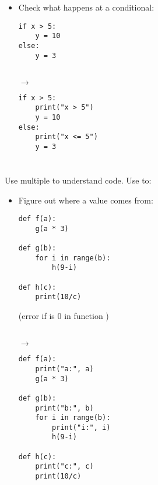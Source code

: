 \documentclass{poster}
\begin{document}
\begin{itemize}
\item Check what happens at a conditional: \\
\noindent
\begin{minipage}[t]{0.45\columnwidth}
\begin{lstlisting}
if x > 5:
    y = 10
else:
    y = 3
\end{lstlisting}
\end{minipage}
\begin{minipage}[t]{0.05\columnwidth}
\  \\
\hspace*{1ex}$\rightarrow$
\end{minipage}
\begin{minipage}[t]{0.45\columnwidth}
\begin{lstlisting}
if x > 5:
    print("x > 5")
    y = 10
else:
    print("x <= 5")
    y = 3
\end{lstlisting}
\end{minipage}


\end{itemize}

\section{}

Use multiple  to understand code. Use to:

\begin{itemize}

\item Figure out where a value comes from: \\
\noindent
\begin{minipage}[t]{0.45\columnwidth}
\begin{lstlisting}
def f(a):
    g(a * 3)

def g(b):
    for i in range(b):
        h(9-i)

def h(c):
    print(10/c)
\end{lstlisting}
(error if  is 0 in function )
\end{minipage}
\begin{minipage}[t]{0.05\columnwidth}
\  \\
\hspace*{1ex}$\rightarrow$
\end{minipage}
\begin{minipage}[t]{0.45\columnwidth}
\begin{lstlisting}
def f(a):
    print("a:", a)
    g(a * 3)

def g(b):
    print("b:", b)
    for i in range(b):
        print("i:", i)
        h(9-i)

def h(c):
    print("c:", c)
    print(10/c)
\end{lstlisting}
\end{minipage}


\end{itemize}
\end{document}
